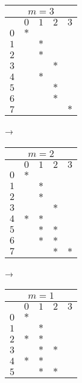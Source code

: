 \documentclass{jsarticle}
\begin{document}
\begin{center}
  \begin{tabular}{|l|c|c|c|c|}\hline
    \multicolumn{5}{|c|}{$m=3$} \\\hline
        & $0$ & $1$ & $2$ & $3$ \\\hline
    $0$ & $*$ &     &     &     \\\hline
    $1$ &     & $*$ &     &     \\\hline
    $2$ &     & $*$ &     &     \\\hline
    $3$ &     &     & $*$ &     \\\hline
    $4$ &     & $*$ &     &     \\\hline
    $5$ &     &     & $*$ &     \\\hline
    $6$ &     &     & $*$ &     \\\hline
    $7$ &     &     &     & $*$ \\\hline
  \end{tabular}
  →\
  \begin{tabular}{|l|c|c|c|c|}\hline
    \multicolumn{5}{|c|}{$m=2$} \\\hline
        & $0$ & $1$ & $2$ & $3$ \\\hline
    $0$ & $*$ &     &     &     \\\hline
    $1$ &     & $*$ &     &     \\\hline
    $2$ &     & $*$ &     &     \\\hline
    $3$ &     &     & $*$ &     \\\hline
    $4$ & $*$ & $*$ &     &     \\\hline
    $5$ &     & $*$ & $*$ &     \\\hline
    $6$ &     & $*$ & $*$ &     \\\hline
    $7$ &     &     & $*$ & $*$ \\\hline
  \end{tabular}
  →\
  \begin{tabular}{|l|c|c|c|c|}\hline
    \multicolumn{5}{|c|}{$m=1$} \\\hline
        & $0$ & $1$ & $2$ & $3$ \\\hline
    $0$ & $*$ &     &     &     \\\hline
    $1$ &     & $*$ &     &     \\\hline
    $2$ & $*$ & $*$ &     &     \\\hline
    $3$ &     & $*$ & $*$ &     \\\hline
    $4$ & $*$ & $*$ &     &     \\\hline
    $5$ &     & $*$ & $*$ &     \\\hline

\end{tabular}
\end{center}
\end{document}
